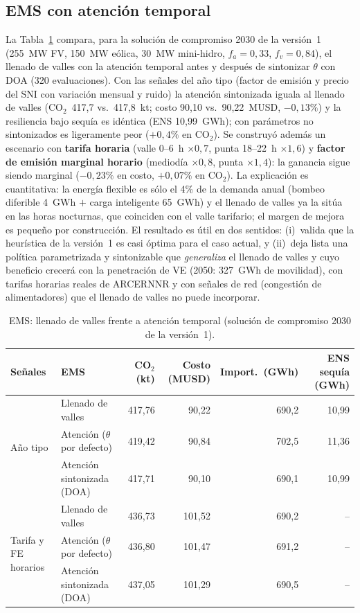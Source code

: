 \documentclass[11pt,a4paper]{article}
\newcommand{\CO}{CO$_2$}
\begin{document}
\subsection{EMS con atenci\'on temporal}
La Tabla~\ref{tab:ems} compara, para la soluci\'on de compromiso 2030 de la versi\'on~1
(255~MW FV, 150~MW e\'olica, 30~MW mini-hidro, $f_a=0{,}33$, $f_v=0{,}84$), el llenado de
valles con la atenci\'on temporal antes y despu\'es de sintonizar $\theta$ con DOA (320
evaluaciones). Con las se\~nales del a\~no tipo (factor de emisi\'on y precio del SNI con
variaci\'on mensual y ruido) la atenci\'on sintonizada iguala al llenado de valles
(\CO\ 417,7 vs.\ 417,8~kt; costo 90,10 vs.\ 90,22~MUSD, $-0{,}13\%$) y la resiliencia bajo
sequ\'ia es id\'entica (ENS 10,99~GWh); con par\'ametros no sintonizados es ligeramente
peor ($+0{,}4\%$ en \CO). Se construy\'o adem\'as un escenario con \textbf{tarifa horaria}
(valle 0--6~h $\times0{,}7$, punta 18--22~h $\times1{,}6$) y \textbf{factor de emisi\'on
marginal horario} (mediod\'ia $\times0{,}8$, punta $\times1{,}4$): la ganancia sigue
siendo marginal ($-0{,}23\%$ en costo, $+0{,}07\%$ en \CO). La explicaci\'on es
cuantitativa: la energ\'ia flexible es s\'olo el 4\% de la demanda anual (bombeo diferible
4~GWh $+$ carga inteligente 65~GWh) y el llenado de valles ya la sit\'ua en las horas
nocturnas, que coinciden con el valle tarifario; el margen de mejora es peque\~no por
construcci\'on. El resultado es \'util en dos sentidos: (i)~valida que la heur\'istica de
la versi\'on~1 es casi \'optima para el caso actual, y (ii)~deja lista una pol\'itica
parametrizada y sintonizable que \emph{generaliza} el llenado de valles y cuyo beneficio
crecer\'a con la penetraci\'on de VE (2050: 327~GWh de movilidad), con tarifas horarias
reales de ARCERNNR y con se\~nales de red (congesti\'on de alimentadores) que el llenado
de valles no puede incorporar.

\begin{table}[htbp]
\centering\small
\caption{EMS: llenado de valles frente a atenci\'on temporal (soluci\'on de compromiso 2030 de la versi\'on~1).}
\label{tab:ems}
\begin{tabular}{llrrrr}
\toprule
\textbf{Se\~nales} & \textbf{EMS} & \textbf{\CO\ (kt)} & \textbf{Costo (MUSD)} & \textbf{Import.\ (GWh)} & \textbf{ENS sequ\'ia (GWh)} \\
\midrule
\multirow{3}{*}{A\~no tipo}
 & Llenado de valles & 417,76 & 90,22 & 690,2 & 10,99 \\
 & Atenci\'on ($\theta$ por defecto) & 419,42 & 90,84 & 702,5 & 11,36 \\
 & Atenci\'on sintonizada (DOA) & 417,71 & 90,10 & 690,1 & 10,99 \\
\midrule
\multirow{3}{*}{Tarifa y FE horarios}
 & Llenado de valles & 436,73 & 101,52 & 690,2 & -- \\
 & Atenci\'on ($\theta$ por defecto) & 436,80 & 101,47 & 691,2 & -- \\
 & Atenci\'on sintonizada (DOA) & 437,05 & 101,29 & 690,5 & -- \\
\bottomrule
\end{tabular}
\end{table}
\end{document}
